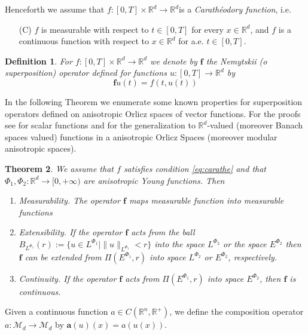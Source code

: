 \documentclass[twoside]{article}
\makeatletter
\newtheorem{thm}{Theorem}[section]
\newtheorem{defi}[thm]{Definition}
\theoremstyle{remark}
\def\namedlabel#1#2{\begingroup
    #2%
    \def\@currentlabel{#2}%
    \phantomsection\label{#1}\endgroup
}
\renewcommand{\b}[1]{\boldsymbol{#1}}
\newcommand{\rr}{\mathbb{R}}
\makeatother
\begin{document}
Henceforth we assume that  $f:[0,T]\times \rr^d\to\rr^d$is a \emph{Carath\'eodory function}, i.e.

\begin{enumerate}
 \item[\namedlabel{eq:carathe}{(C)}] $f$ is measurable with respect to $t\in [0,T]$ for every  $x\in\rr^d$, and $f$ is a continuous function with  respect to  $x\in\rr^d$ for a.e. $t \in [0,T]$.
\end{enumerate}




\begin{defi}
 For $f:[0,T]\times \rr^d\to\rr^d$  we denote by $\b{f}$ the Nemytskii (o superposition) operator defined for functions $u:[0,T]\to\rr^d$ by
\[\b{f}u(t)=f(t,u(t))\]
\end{defi}

In the following Theorem we enumerate  some known properties for superposition operators defined on anisotropic Orlicz spaces of vector functions.   For the proofs see \cite{krasnosel2011integral} for scalar functions  and
\cite{zbMATH04038592,zbMATH03983966,zbMATH03942215} for the generalization to  $\mathbb{R}^d$-valued  (moreover Banach spaces valued)  functions in a anisotropic Orlicz Spaces (moreover modular anisotropic spaces).

\begin{thm} We assume that $f$ satisfies condition \eqref{eq:carathe} and that $\Phi_1,\Phi_2:\rr^d\to [0,+\infty)$ are anisotropic Young functions. Then
\begin{enumerate}
 \item\label{it:measure}\emph{Measurability.}  The operator $\b{f}$ maps  measurable function into measurable functions
 \item\label{it:exten}\emph{Extensibility.}  If the operator $\b{f}$ acts from the ball $B_{L^{\Phi_1}}(r):=\{ u\in L^{\Phi_1}| \|u\|_{L^{\Phi_1}}<r\}$ into the space $L^{\Phi_2}$ or the space $E^{\Phi_2}$ then $\b{f}$ can be extended  from $\Pi(E^{\Phi_1},r)$ into space $L^{\Phi_2}$ or  $E^{\Phi_2}$, respectively.
 \item\label{it:exten}\emph{Continuity.} If the operator $\b{f}$ acts from $\Pi(E^{\Phi_1},r)$ into space $E^{\Phi_2}$, then $\b{f}$ is continuous.
\end{enumerate}
\end{thm}



Given a continuous function $a\in C(\mathbb{R}^n,\mathbb{R}^+)$, we define the composition operator $a:\mathcal{M}_d\to \mathcal{M}_d$ by $\b{a}(u)(x)= a(u(x))$.
\end{document}
